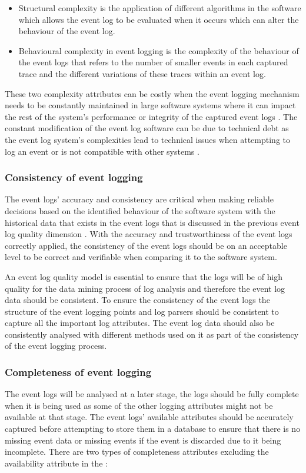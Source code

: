 \begin{itemize}
	\item Structural complexity is the application of different algorithms in the software which allows the event log to be evaluated when it occurs which can alter the behaviour of the event log.
	\item Behavioural complexity in event logging is the complexity of the behaviour of the event logs that refers to the number of smaller events in each captured trace and the different variations of these traces within an event log.
\end{itemize}

These two complexity attributes can be costly when the event logging mechanism needs to be constantly maintained in large software systems where it can impact the rest of the system's performance or integrity of the captured event logs \cite{Ogheneovo2014}. The constant modification of the event log software can be due to technical debt as the event log system's complexities lead to technical issues when attempting to log an event or is not compatible with other systems \cite{DeLeon-Sigg2020}.  

\subsubsection{Consistency of event logging} 
The event logs' accuracy and consistency are critical when making reliable decisions based on the identified behaviour of the software system with the historical data that exists in the event logs that is discussed in the previous event log quality dimension \cite{Stojanov2017, Kherbouche2017}. With the accuracy and trustworthiness of the event logs correctly applied, the consistency of the event logs should be on an acceptable level to be correct and verifiable when comparing it to the software system. \par An event log quality model is essential to ensure that the logs will be of high quality for the data mining process of log analysis and therefore the event log data should be consistent. To ensure the consistency of the event logs the structure of the event logging points and log parsers should be consistent to capture all the important log attributes. The event log data should also be consistently analysed with different methods used on it as part of the consistency of the event logging process.

\subsubsection{Completeness of event logging} 
The event logs will be analysed at a later stage, the logs should be fully complete when it is being used as some of the other logging attributes might not be available at that stage. The event logs' available attributes should be accurately captured before attempting to store them in a database to ensure that there is no missing event data or missing events if the event is discarded due to it being incomplete. There are two types of completeness attributes excluding the availability attribute in the :

